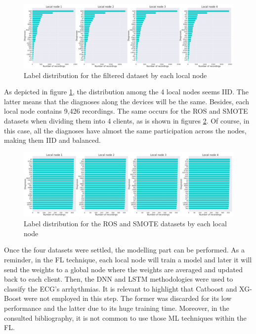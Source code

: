 \begin{figure}[H]
\centering
\includegraphics[scale=0.4]{img/fl_label_distro_filtered.png}
\caption{Label distribution for the filtered dataset by each local node}
\label{fig:fl_label_distro_filtered}
\end{figure}

As depicted in figure \ref{fig:fl_label_distro_filtered}, the distribution among the 4 local nodes seems IID. The latter means that the diagnoses along the devices will be the same. Besides, each local node contains 9,426 recordings. The same occurs for the ROS and SMOTE datasets when dividing them into 4 clients, as is shown in figures \ref{fig:fl_label_distro_filtered_ROS_SMT}. Of course, in this case, all the diagnoses have almost the same participation across the nodes, making them IID and balanced.

\begin{figure}[H]
\centering
\includegraphics[scale=0.4]{img/fl_label_distro_filtered_ROS_SMT.png}
\caption{Label distribution for the ROS and SMOTE datasets by each local node}
\label{fig:fl_label_distro_filtered_ROS_SMT}
\end{figure}

Once the four datasets were settled, the modelling part can be performed. As a reminder, in the FL technique, each local node will train a model and later it will send the weights to a global node where the weights are averaged and updated back to each client. Then, the DNN and LSTM methodologies were used to classify the ECG's arrhythmias. It is relevant to highlight that Catboost and XG-Boost were not employed in this step. The former was discarded for its low performance and the latter due to its huge training time. Moreover, in the consulted bibliography, it is not common to use those ML techniques within the FL.


